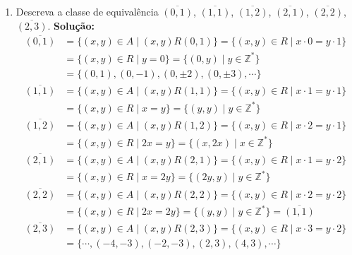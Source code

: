 \documentclass[12pt]{article}
\newcommand{\z}{\mathbb{Z}}
\begin{document}
\begin{enumerate}[label={\alph*})]
\item Descreva a classe de equival{\^e}ncia $\overline{(0,1)}$, $\overline{(1,1)}$, $\overline{(1,2)}$, $\overline{(2,1)}$, $\overline{(2,2)}$, $\overline{(2,3)}$.
\noindent\textbf{Solu\c{c}\~ao:}
\begin{align*}
	\overline{(0,1)} &= \{ (x, y) \in A \mid (x,y)R(0,1)\} = \{ (x,y) \in R \mid x\cdot 0 = y\cdot 1\} \\ &= \{ (x,y) \in R \mid y = 0 \} = \{(0, y) \mid y \in \z^*\} \\ &= \{ (0,1), (0,-1), (0,\pm 2) , (0, \pm 3), \cdots\}\\
	\overline{(1,1)} &= \{ (x, y) \in A \mid (x,y)R(1,1)\} = \{ (x,y) \in R \mid x\cdot 1 = y\cdot 1\} \\ &= \{ (x,y) \in R \mid x = y \} = \{(y, y) \mid y \in \z^*\}\\
	\overline{(1,2)} &= \{ (x, y) \in A \mid (x,y)R(1,2)\} = \{ (x,y) \in R \mid x\cdot 2 = y\cdot 1\} \\ &= \{ (x,y) \in R \mid 2x = y \} = \{(x, 2x) \mid x \in \z^*\}\\
	\overline{(2,1)} &= \{ (x, y) \in A \mid (x,y)R(2,1)\} = \{ (x,y) \in R \mid x\cdot 1 = y\cdot 2\} \\ &= \{ (x,y) \in R \mid x = 2y \} = \{(2y, y) \mid y \in \z^*\}\\
	\overline{(2,2)} &= \{ (x, y) \in A \mid (x,y)R(2,2)\} = \{ (x,y) \in R \mid x\cdot 2 = y\cdot 2\} \\ &= \{ (x,y) \in R \mid 2x = 2y \} = \{(y, y) \mid y \in \z^*\} = \overline{(1,1)}\\
	\overline{(2,3)} &= \{ (x, y) \in A \mid (x,y)R(2,3)\} = \{ (x,y) \in R \mid x\cdot 3 = y\cdot 2\} \\ &= \{ \cdots,(-4,-3),(-2,-3), (2,3), (4,3), \cdots\}
\end{align*}
\end{enumerate}
\end{document}
